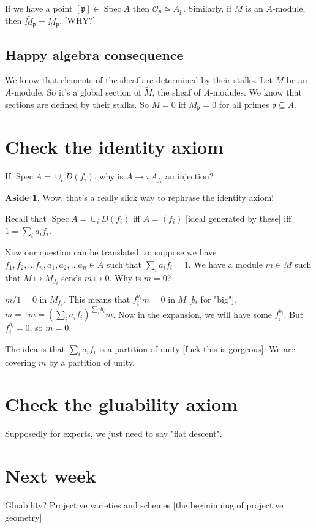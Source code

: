 \documentclass{book}
\renewcommand{\O}{\ensuremath{\mathcal{O}}}
\newcommand{\Spec}{\operatorname{Spec}}
\newcommand{\spec}{\operatorname{Spec}}
\newcommand{\p}{\mathfrak{p}}
\theoremstyle{definition}
\newtheorem{aside}[theorem]{Aside}
\begin{document}
If we have a point $[\p] \in \Spec A$ then $\O_p \simeq A_p$. 
Similarly, if $M$ is an $A$-module, then $\tilde{M_\p} = M_\p$. [WHY?]

\subsection{Happy algebra consequence}
We know that elements of the sheaf are determined by their stalks.
Let $M$ be an $A$-module. So it's a global section of $\tilde{M}$, the
sheaf of $A$-modules. We know that sections are defined by their
stalks. So $M = 0$ iff $M_\p = 0$ for all primes $\p \subseteq A$.

\section{Check the identity axiom}

If $\Spec A = \cup_i D(f_i)$, why is $A \rightarrow \pi A_{f_i}$ an injection?
\begin{aside}
Wow, that's a really slick way to rephrase the identity axiom!
\end{aside}
Recall that $\spec A = \cup_i D(f_i)$ iff $A = (f_i)$ [ideal generated by these]
iff $1 = \sum_i a_i f_i$.


Now our question can be translated to:
suppose we have $f_1, f_2, \dots f_n, a_1, a_2, \dots a_n \in A$ such that
$\sum_i a_i f_i = 1$.  We have a module $m \in M$ such that
$M \mapsto M_{f_i}$ sends $m \mapsto 0$. Why is $m = 0$?

$m/1 = 0$ in $M_{f_i}$. This means that $f_i^{b_i} m = 0$  in $M$ [$b_i$ for "big"].
$m = 1 m = (\sum_i a_i f_i)^{\sum_i b_i} m$. Now in the expansion, we will
have some $f_i^{b_i}$. But $f_i^{b_i} = 0$, so $m = 0$.

The idea is that $\sum_i a_if_i$ is a partition of unity [fuck this is gorgeous].
We are covering $m$ by a partition of unity.


\section{Check the gluability axiom}
Supposedly for experts, we just need to say "flat descent".  

\section{Next week}
Gluability? Projective varieties and schemes [the begininning of projective geometry]
\end{document}
